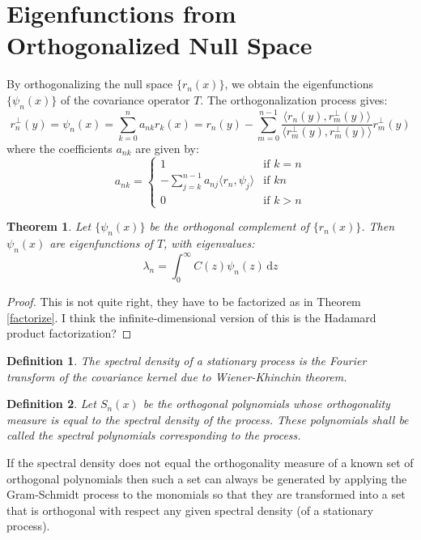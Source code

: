 \documentclass{article}
\newtheorem{theorem}{Theorem}
\newtheorem{definition}{Definition}
\begin{document}
\section{Eigenfunctions from Orthogonalized Null Space}

By orthogonalizing the null space $\{r_n (x)\}$, we obtain the eigenfunctions
$\{\psi_n (x)\}$ of the covariance operator $T$. The orthogonalization process
gives:
\[ r^{\perp}_n (y) = \psi_n (x) = \sum_{k = 0}^n a_{nk} r_k (x) = r_n (y) -
\sum_{m = 0}^{n - 1} \frac{\langle r_n (y), r^{\perp}_m (y)
\rangle}{\langle r^{\perp}_m (y), r^{\perp}_m (y) \rangle} r^{\perp}_m (y)
\]
where the coefficients $a_{nk}$ are given by:
\begin{equation}
a_{nk} = \left\{ \begin{array}{ll}
1 & \text{if } k = n\\
- \sum_{j = k}^{n - 1} a_{nj} \langle r_n, \psi_j \rangle & \text{if } k 
n\\
0 & \text{if } k > n
\end{array} \right.
\end{equation}
\begin{theorem}
Let $\{\psi_n (x)\}$ be the orthogonal complement of $\{r_n (x)\}$. Then
$\psi_n (x)$ are eigenfunctions of $T$, with eigenvalues:
\begin{equation}
\lambda_n = \int_0^{\infty} C (z) \psi_n (z) \, \mathrm{d} z
\end{equation}
\end{theorem}

\begin{proof}
This is not quite right, they have to be factorized as in Theorem
\ref{factorize}. I think the infinite-dimensional version of this is the
Hadamard product factorization?
\end{proof}

\begin{definition}
The spectral density of a stationary process is the Fourier transform of the
covariance kernel due to Wiener-Khinchin theorem.
\end{definition}

\begin{definition}
Let $S_n (x)$ be the orthogonal polynomials whose orthogonality measure is
equal to the spectral density of the process. These polynomials shall be
called the spectral polynomials corresponding to the process.
\end{definition}

\begin{remark}
If the spectral density does not equal the orthogonality measure of a known
set of orthogonal polynomials then such a set can always be generated by
applying the Gram-Schmidt process to the monomials so that they are
transformed into a set that is orthogonal with respect any given spectral
density (of a stationary process).
\end{remark}
\end{document}
